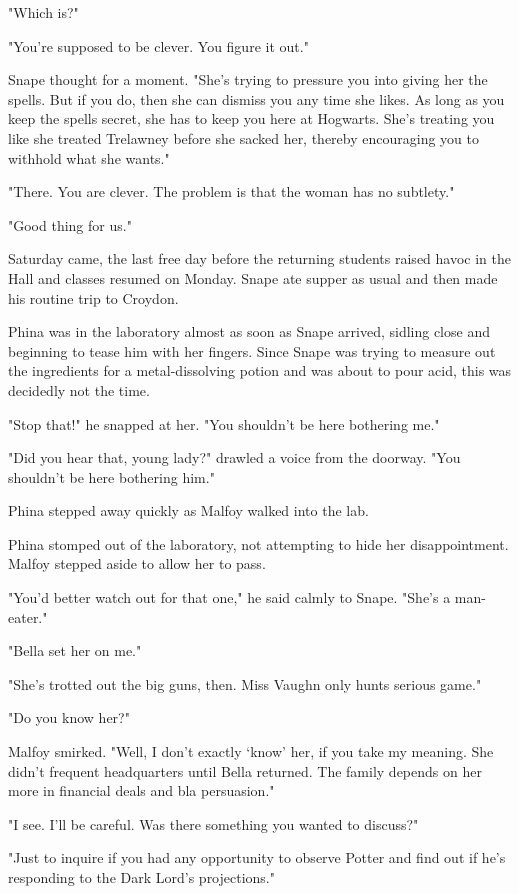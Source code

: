 "Which is?"

"You're supposed to be clever. You figure it out."

Snape thought for a moment. "She's trying to pressure you into giving her the spells. But if you do, then she can dismiss you any time she likes. As long as you keep the spells secret, she has to keep you here at Hogwarts. She's treating you like she treated Trelawney before she sacked her, thereby encouraging you to withhold what she wants."

"There. You are clever. The problem is that the woman has no subtlety."

"Good thing for us."

Saturday came, the last free day before the returning students raised havoc in the Hall and classes resumed on Monday. Snape ate supper as usual and then made his routine trip to Croydon.

Phina was in the laboratory almost as soon as Snape arrived, sidling close and beginning to tease him with her fingers. Since Snape was trying to measure out the ingredients for a metal-dissolving potion and was about to pour acid, this was decidedly not the time.

"Stop that!" he snapped at her. "You shouldn't be here bothering me."

"Did you hear that, young lady?" drawled a voice from the doorway. "You shouldn't be here bothering him."

Phina stepped away quickly as Malfoy walked into the lab.

Phina stomped out of the laboratory, not attempting to hide her disappointment. Malfoy stepped aside to allow her to pass.

"You'd better watch out for that one," he said calmly to Snape. "She's a man-eater."

"Bella set her on me."

"She's trotted out the big guns, then. Miss Vaughn only hunts serious game."

"Do you know her?"

Malfoy smirked. "Well, I don't exactly `know' her, if you take my meaning. She didn't frequent headquarters until Bella returned. The family depends on her more in financial deals and bla{\el} persuasion."

"I see. I'll be careful. Was there something you wanted to discuss?"

"Just to inquire if you had any opportunity to observe Potter and find out if he's responding to the Dark Lord's projections."

